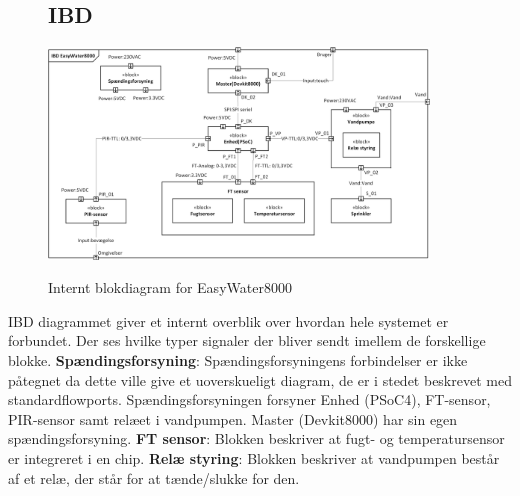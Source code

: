 \begin{figure}[H] \centering
\subsection{IBD}
{\includegraphics[width=0.9\textwidth]{filer/systemarkitektur/IBD}}
\caption{Internt blokdiagram for EasyWater8000}
\label{lab:ibd}
\raggedright
\end{figure}
IBD diagrammet giver et internt overblik over hvordan hele systemet er forbundet. Der ses hvilke typer signaler der bliver sendt imellem de forskellige blokke. \newline \newline
\textbf{Spændingsforsyning}: Spændingsforsyningens forbindelser er ikke påtegnet da dette ville give et uoverskueligt diagram, de er i stedet beskrevet med standardflowports. Spændingsforsyningen forsyner Enhed (PSoC4), FT-sensor, PIR-sensor samt relæet i vandpumpen. Master (Devkit8000) har sin egen spændingsforsyning.  \newline \newline
\textbf{FT sensor}: Blokken beskriver at fugt- og temperatursensor er integreret i en chip. \newline \newline
\textbf{Relæ styring}: Blokken beskriver at vandpumpen består af et relæ, der står for at tænde/slukke for den. \newline \newline

